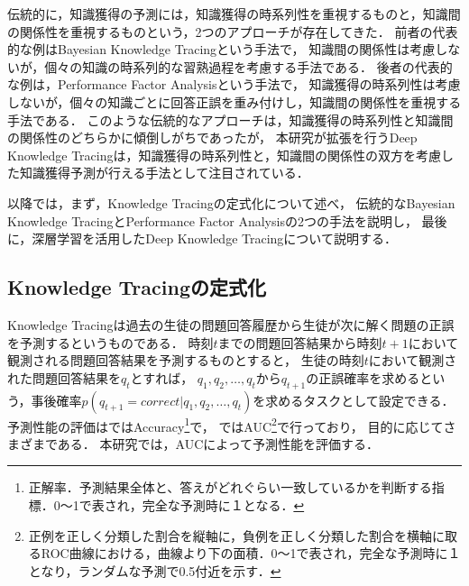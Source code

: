 伝統的に，知識獲得の予測には，知識獲得の時系列性を重視するものと，知識間の関係性を重視するものという，2つのアプローチが存在してきた．
前者の代表的な例はBayesian Knowledge Tracing\cite{corbett1994knowledge}という手法で，
知識間の関係性は考慮しないが，個々の知識の時系列的な習熟過程を考慮する手法である．
後者の代表的な例は，Performance Factor Analysis\cite{pavlik2009performance}という手法で，
知識獲得の時系列性は考慮しないが，個々の知識ごとに回答正誤を重み付けし，知識間の関係性を重視する手法である．
このような伝統的なアプローチは，知識獲得の時系列性と知識間の関係性のどちらかに傾倒しがちであったが，
本研究が拡張を行うDeep Knowledge Tracing\cite{piech2015deep}は，知識獲得の時系列性と，知識間の関係性の双方を考慮した知識獲得予測が行える手法として注目されている．


以降では，まず，Knowledge Tracingの定式化について述べ，
伝統的なBayesian Knowledge TracingとPerformance Factor Analysisの2つの手法を説明し，
最後に，深層学習を活用したDeep Knowledge Tracingについて説明する．


\subsection{Knowledge Tracingの定式化}
Knowledge Tracingは過去の生徒の問題回答履歴から生徒が次に解く問題の正誤を予測するというものである．
時刻$t$までの問題回答結果から時刻$t+1$において観測される問題回答結果を予測するものとすると，
生徒の時刻$t$において観測された問題回答結果を$q_{t}$とすれば，
$q_1, q_2, \dots, q_t$から$q_{t+1}$の正誤確率を求めるという，事後確率$p(q_{t+1} = correct|q_1, q_2, \dots, q_t)$を求めるタスクとして設定できる．
予測性能の評価は\cite{yudelson2013individualized, falakmasir2015spectral}ではAccuracy\footnote{正解率．予測結果全体と、答えがどれぐらい一致しているかを判断する指標．0〜1で表され，完全な予測時に１となる．}で，
\cite{piech2015deep}ではAUC\footnote{正例を正しく分類した割合を縦軸に，負例を正しく分類した割合を横軸に取るROC曲線における，曲線より下の面積．0〜1で表され，完全な予測時に１となり，ランダムな予測で0.5付近を示す．}で行っており，
目的に応じてさまざまである．
本研究では，AUCによって予測性能を評価する．

